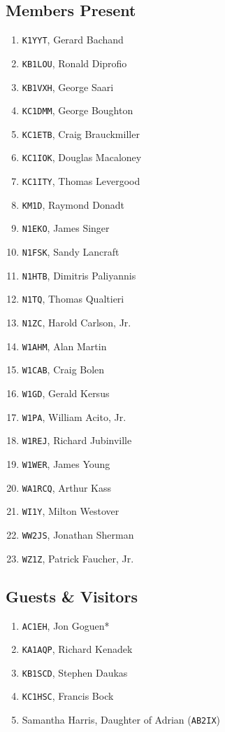 \documentclass[10pt,letterpaper]{article}
\begin{document}
\subsection{Members Present}
\begin{enumerate}
\item \texttt{K1YYT}, Gerard Bachand
\item \texttt{KB1LOU}, Ronald Diprofio
\item \texttt{KB1VXH}, George Saari
\item \texttt{KC1DMM}, George Boughton
\item \texttt{KC1ETB}, Craig Brauckmiller
\item \texttt{KC1IOK}, Douglas Macaloney
\item \texttt{KC1ITY}, Thomas Levergood
\item \texttt{KM1D}, Raymond Donadt
\item \texttt{N1EKO}, James Singer
\item \texttt{N1FSK}, Sandy Lancraft
\item \texttt{N1HTB}, Dimitris Paliyannis
\item \texttt{N1TQ}, Thomas Qualtieri
\item \texttt{N1ZC}, Harold Carlson, Jr.
\item \texttt{W1AHM}, Alan Martin
\item \texttt{W1CAB}, Craig Bolen
\item \texttt{W1GD}, Gerald Kersus
\item \texttt{W1PA}, William Acito, Jr.
\item \texttt{W1REJ}, Richard Jubinville
\item \texttt{W1WER}, James Young
\item \texttt{WA1RCQ}, Arthur Kass
\item \texttt{WI1Y}, Milton Westover
\item \texttt{WW2JS}, Jonathan Sherman
\item \texttt{WZ1Z}, Patrick Faucher, Jr.
\end{enumerate}

\subsection{Guests \& Visitors}
\begin{enumerate}
\item \texttt{AC1EH}, Jon Goguen*
\item \texttt{KA1AQP}, Richard Kenadek
\item \texttt{KB1SCD}, Stephen Daukas
\item \texttt{KC1HSC}, Francis Bock
\item Samantha Harris, Daughter of Adrian (\texttt{AB2IX})
\end{enumerate}
\end{document}
